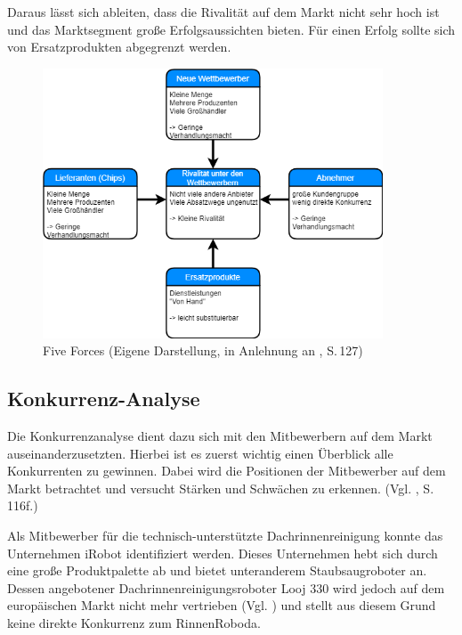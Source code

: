         \noindent
        Daraus lässt sich ableiten, dass die Rivalität auf dem Markt nicht sehr hoch ist und das Marktsegment große
        Erfolgsaussichten bieten. Für einen Erfolg sollte sich von Ersatzprodukten abgegrenzt werden.
        \pagebreak

        \begin{figure}[ht]
            \centering
            \includegraphics[width = 0.9\textwidth]{Eigene Darstellungen/Distributionswege2.png}

            \caption{Five Forces (Eigene Darstellung, in Anlehnung an \cite{Gamayanto2005}, S.\,127)}
        \end{figure}

        \subsection{Konkurrenz-Analyse}

            Die Konkurrenzanalyse dient dazu sich mit den Mitbewerbern auf dem Markt auseinanderzusetzten. Hierbei ist
            es zuerst wichtig einen Überblick alle Konkurrenten zu gewinnen. Dabei wird die Positionen der Mitbewerber
            auf dem Markt betrachtet und versucht Stärken und Schwächen zu erkennen.
            (Vgl. \cite{Diller2007}, S.\,116f.)

            Als Mitbewerber für die technisch-unterstützte Dachrinnenreinigung konnte das Unternehmen iRobot
            identifiziert werden. Dieses Unternehmen hebt sich durch eine große Produktpalette ab und bietet
            unteranderem Staubsaugroboter an. Dessen angebotener Dachrinnenreinigungsroboter Looj 330 wird jedoch auf
            dem europäischen Markt nicht mehr vertrieben (Vgl. \cite{Erickson2021}) und stellt aus diesem Grund keine direkte
            Konkurrenz zum \as RinnenRobo\adl da.        
        

